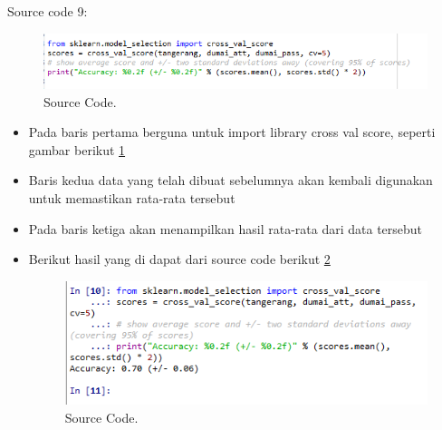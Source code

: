Source code 9:
		\begin{figure}[ht]
		\centerline{\includegraphics[width=1\textwidth]{figures/im/imQ9.png}}
		\caption{Source Code.}
		\label{sembilanQ}
		\end{figure}
\begin{itemize}
\item Pada baris pertama berguna untuk import library cross val score, seperti gambar berikut \ref{sembilanQ}
\item Baris kedua data yang telah dibuat sebelumnya akan kembali digunakan untuk memastikan rata-rata tersebut
\item Pada baris ketiga akan menampilkan hasil rata-rata dari data tersebut
\item Berikut hasil yang di dapat dari source code berikut \ref{sembilanC}
		\begin{figure}[ht]
		\centerline{\includegraphics[width=1\textwidth]{figures/im/imCode9.png}}
		\caption{Source Code.}
		\label{sembilanC}
		\end{figure}
\end{itemize}

